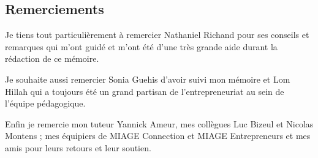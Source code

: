 \begin{center}
\subsection*{Remerciements}
\end{center}

\hskip7mm

\begin{spacing}{1.3}
Je tiens tout particulièrement à remercier Nathaniel {Richand} pour ses conseils et remarques qui m'ont guidé et m'ont été d'une très grande aide durant la rédaction de ce mémoire.

Je souhaite aussi remercier Sonia Guehis d'avoir suivi mon mémoire et Lom Hillah qui a toujours été un grand partisan de l'entrepreneuriat au sein de l'équipe pédagogique.

Enfin je remercie mon tuteur Yannick Ameur, mes collègues Luc Bizeul et Nicolas Montens ; mes équipiers de MIAGE Connection et MIAGE Entrepreneurs et mes amis pour leurs retours et leur soutien. 
\end{spacing}